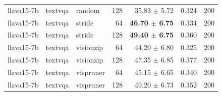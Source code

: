 \begin{tabular}{lllrrrr}
llava15-7b & textvqa & random & 128 & 35.83 $\pm$ 5.72 & 0.324 & 200 \\
llava15-7b & textvqa & stride & 64 & \textbf{46.70 $\pm$ 6.75} & 0.334 & 200 \\
llava15-7b & textvqa & stride & 128 & \textbf{49.40 $\pm$ 6.75} & 0.360 & 200 \\
llava15-7b & textvqa & visionzip & 64 & 44.20 $\pm$ 6.80 & 0.325 & 200 \\
llava15-7b & textvqa & visionzip & 128 & 47.35 $\pm$ 6.85 & 0.377 & 200 \\
llava15-7b & textvqa & vispruner & 64 & 45.15 $\pm$ 6.65 & 0.340 & 200 \\
llava15-7b & textvqa & vispruner & 128 & 49.20 $\pm$ 6.73 & 0.352 & 200 \\
\bottomrule
\end{tabular}
